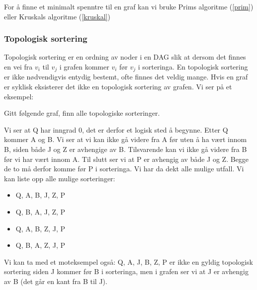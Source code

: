 For å finne et minimalt spenntre til en graf kan vi bruke Prims algoritme (\ref{prim}) eller Kruskals algoritme (\ref{kruskal})


\subsubsection{Topologisk sortering}
Topologisk sortering er en ordning av noder i en DAG slik at dersom det finnes en vei fra $ v_i $ til $ v_j $ i grafen kommer $ v_i $ før $ v_j $ i sorteringa. En topologisk sortering er ikke nødvendigvis entydig bestemt, ofte finnes det veldig mange. Hvis en graf er syklisk eksisterer det ikke en topologisk sortering av grafen. Vi ser på et eksempel: 

\begin{example} Gitt følgende graf, finn alle topologiske sorteringer.
\begin{figure}[H]
\centering
{}
\end{figure}

Vi ser at Q har inngrad 0, det er derfor et logisk sted å begynne. Etter Q kommer A og B. Vi ser at vi kan ikke gå videre fra A før uten å ha vært innom B, siden både J og Z er avhengige av B. Tilsvarende kan vi ikke gå videre fra B før vi har vært innom A. Til slutt ser vi at P er avhengig av både J og Z. Begge de to må derfor komme før P i sorteringa. Vi har da dekt alle mulige utfall. Vi kan liste opp alle mulige sorteringer:
\begin{itemize}
\item Q, A, B, J, Z, P
\item Q, B, A, J, Z, P
\item Q, A, B, Z, J, P
\item Q, B, A, Z, J, P
\end{itemize}

Vi kan ta med et moteksempel også: Q, A, J, B, Z, P er ikke en gyldig topologisk sortering siden J kommer før B i sorteringa, men i grafen ser vi at J er avhengig av B (det går en kant fra B til J).
\end{example}



